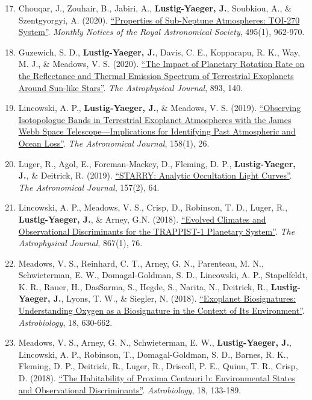 \documentclass[margin,10pt]{res}
\newenvironment{benumerate}[1]{
    \let\oldItem\item
    \def\item{\addtocounter{enumi}{-2}\oldItem}
    \begin{enumerate}
    \setcounter{enumi}{#1}
    \addtocounter{enumi}{1}
}{
    \end{enumerate}
}
\begin{document}
\begin{resume}
\begin{benumerate}{16}
                    \item Chouqar, J., Zouhair, B., Jabiri, A., \textbf{Lustig-Yaeger, J.}, Soubkiou, A., \& Szentgyorgyi, A. (2020). \href{https://ui.adsabs.harvard.edu/abs/2020MNRAS.495..962C/abstract}{``Properties of Sub-Neptune Atmospheres: TOI-270 System''}. \textit{Monthly Notices of the Royal Astronomical Society}, 495(1), 962-970.
                    \item Guzewich, S. D., \textbf{Lustig-Yaeger, J.}, Davis, C. E., Kopparapu, R. K., Way, M. J., \& Meadows, V. S.  (2020). \href{https://ui.adsabs.harvard.edu/abs/2020arXiv200202549G/abstract}{``The Impact of Planetary Rotation Rate on the Reflectance and Thermal Emission Spectrum of Terrestrial Exoplanets Around Sun-like Stars''}. \textit{The Astrophysical Journal}, 893, 140. 
                    \item Lincowski, A. P., \textbf{Lustig-Yaeger, J.}, \& Meadows, V. S.  (2019). \href{https://doi.org/10.3847/1538-3881/ab2385}{``Observing Isotopologue Bands in Terrestrial Exoplanet Atmospheres with the James Webb Space Telescope---Implications for Identifying Past Atmospheric and Ocean Loss''}. \textit{The Astronomical Journal}, 158(1), 26.
                    \item Luger, R., Agol, E., Foreman-Mackey, D., Fleming, D. P., \textbf{Lustig-Yaeger, J.}, \& Deitrick, R. (2019).  \href{http://adsabs.harvard.edu/cgi-bin/bib_query?arXiv:1810.06559}{``STARRY: Analytic Occultation Light Curves''}. \textit{The Astronomical Journal}, 157(2), 64.
                    \item Lincowski, A. P., Meadows, V. S., Crisp, D., Robinson, T. D., Luger, R., \textbf{Lustig-Yaeger, J.}, \& Arney, G.N. (2018). \href{http://adsabs.harvard.edu/cgi-bin/bib_query?arXiv:1809.07498}{``Evolved Climates and Observational Discriminants for the TRAPPIST-1 Planetary System''}. \textit{The Astrophysical Journal}, 867(1), 76.
                    \item Meadows, V. S.,  Reinhard, C. T., Arney, G. N., Parenteau, M. N., Schwieterman, E. W., Domagal-Goldman, S. D., Lincowski, A. P., Stapelfeldt, K. R., Rauer, H., DasSarma, S., Hegde, S., Narita, N., Deitrick, R., \textbf{Lustig-Yaeger, J.}, Lyons, T. W., \& Siegler, N. (2018).  \href{http://adsabs.harvard.edu/abs/2018AsBio..18..630M}{``Exoplanet Biosignatures:  Understanding Oxygen as a Biosignature in the Context of Its Environment''}. \textit{Astrobiology}, 18, 630-662.
                    \item Meadows, V. S., Arney, G. N., Schwieterman, E. W., \textbf{Lustig-Yaeger, J.}, Lincowski, A. P., Robinson, T.,  Domagal-Goldman, S. D., Barnes, R. K., Fleming, D. P., Deitrick, R., Luger, R., Driscoll, P. E., Quinn, T. R., Crisp, D. (2018). \href{http://adsabs.harvard.edu/abs/2018AsBio..18..133M}{``The Habitability of Proxima Centauri b: Environmental States and Observational Discriminants''}. \textit{Astrobiology}, 18, 133-189.

\end{benumerate}
\end{resume}
\end{document}
